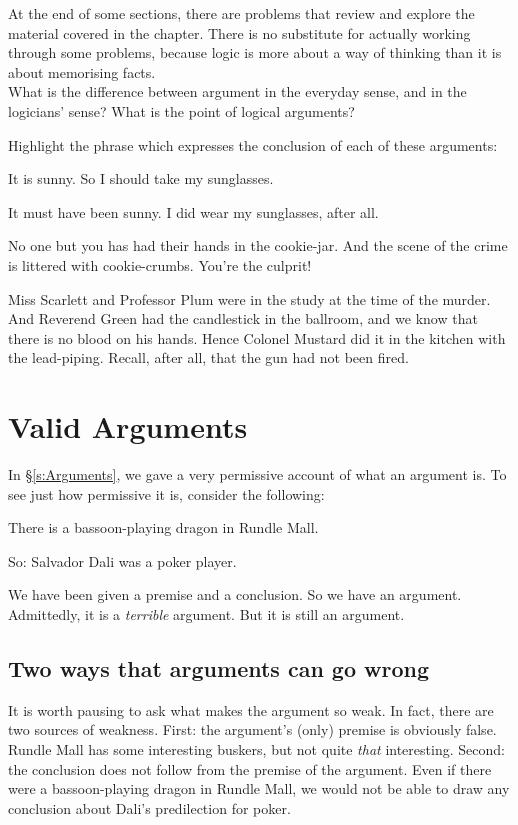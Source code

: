 \practiceproblems
At the end of some sections, there are problems that review and explore the material covered in the chapter. There is no substitute for actually working through some problems, because logic is more about a way of thinking than it is about memorising facts.\\[12pt]

\problempart What is the difference between argument in the everyday sense, and in the logicians’ sense? What is the point of logical arguments?

\problempart 
Highlight the phrase which expresses the conclusion of each of these arguments:
\begin{earg}
	\item It is sunny. So I should take my sunglasses.
	\item It must have been sunny. I did wear my sunglasses, after all.
	\item No one but you has had their hands in the cookie-jar. And the scene of the crime is littered with cookie-crumbs. You're the culprit!
	\item Miss Scarlett and Professor Plum were in the study at the time of the murder. And Reverend Green had the candlestick in the ballroom, and we know that there is no blood on his hands. Hence Colonel Mustard did it in the kitchen with the lead-piping. Recall, after all, that the gun had not been fired.
\end{earg}


\chapter{Valid Arguments}\label{s:Valid}
In §\ref{s:Arguments}, we gave a very permissive account of what an argument is. To see just how permissive it is, consider the following:
	\begin{earg}
		\item[] There is a bassoon-playing dragon in Rundle Mall.
		\item[So:] Salvador Dali was a poker player.
	\end{earg}
We have been given a premise and a conclusion. So we have an argument. Admittedly, it is a \emph{terrible} argument. But it is still an argument.

\section{Two ways that arguments can go wrong}

It is worth pausing to ask what makes the argument so weak. In fact, there are two sources of weakness. First: the argument's (only) premise is obviously false. Rundle Mall has some interesting buskers, but not quite \emph{that} interesting. Second: the conclusion does not follow from the premise of the argument. Even if there were a bassoon-playing dragon in Rundle Mall, we would not be able to draw any conclusion about Dali's predilection for poker.

